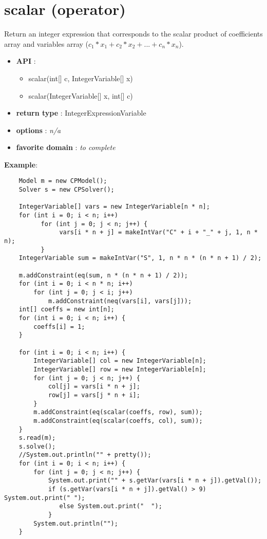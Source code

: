 \label{scalar}
\hypertarget{scalar}{}

\section{scalar (operator)}\label{scalar:scalaroperator}\hypertarget{scalar:scalaroperator}{}
Return an integer expression that corresponds to the scalar product of coefficients array and variables array (\(c_1*x_1+c_2*x_2+...+c_n*x_n\)).

\begin{itemize}
	\item \textbf{API} :
	\begin{itemize}
		\item scalar(int[] c, IntegerVariable[] x)
		\item scalar(IntegerVariable[] x, int[] c)
	\end{itemize}
	\item \textbf{return type} : IntegerExpressionVariable
	\item \textbf{options} : \emph{n/a}
	\item \textbf{favorite domain} : \emph{to complete}
\end{itemize}

\textbf{Example}:

\begin{lstlisting}
	Model m = new CPModel();
	Solver s = new CPSolver();
	
	IntegerVariable[] vars = new IntegerVariable[n * n];
	for (int i = 0; i < n; i++)
	      for (int j = 0; j < n; j++) {
	           vars[i * n + j] = makeIntVar("C" + i + "_" + j, 1, n * n);
	      }
	IntegerVariable sum = makeIntVar("S", 1, n * n * (n * n + 1) / 2);
	
	m.addConstraint(eq(sum, n * (n * n + 1) / 2));
	for (int i = 0; i < n * n; i++)
	    for (int j = 0; j < i; j++)
	        m.addConstraint(neq(vars[i], vars[j]));
	int[] coeffs = new int[n];
	for (int i = 0; i < n; i++) {
	    coeffs[i] = 1;
	}
	
	for (int i = 0; i < n; i++) {
	    IntegerVariable[] col = new IntegerVariable[n];    
	    IntegerVariable[] row = new IntegerVariable[n];
	    for (int j = 0; j < n; j++) {
	        col[j] = vars[i * n + j];
	        row[j] = vars[j * n + i];
	    } 
	    m.addConstraint(eq(scalar(coeffs, row), sum));
	    m.addConstraint(eq(scalar(coeffs, col), sum));
	}
	s.read(m);
	s.solve();
	//System.out.println("" + pretty());
	for (int i = 0; i < n; i++) {
	    for (int j = 0; j < n; j++) {   
	        System.out.print("" + s.getVar(vars[i * n + j]).getVal());
	        if (s.getVar(vars[i * n + j]).getVal() > 9) System.out.print(" ");
	           else System.out.print("  ");
	        }
	    System.out.println("");
	}
\end{lstlisting}
